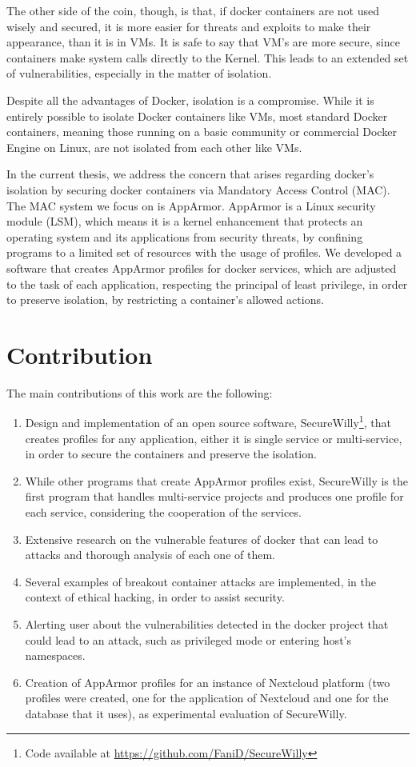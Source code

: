 The other side of the coin, though, is that, if docker containers are not used wisely and secured, it is more easier for threats and exploits to make their appearance, than it is in VMs. It is safe to say that VM's are more secure, since containers make system calls directly to the Kernel. This leads to an extended set of vulnerabilities, especially in the matter of isolation.

Despite all the advantages of Docker, isolation is a compromise. While it is entirely possible to isolate Docker containers like VMs, most standard Docker containers, meaning those running on a basic community or commercial Docker Engine on Linux, are not isolated from each other like VMs.

In the current thesis, we address the concern that arises regarding docker's isolation by securing docker containers via Mandatory Access Control (MAC). The MAC system we focus on is AppArmor. AppArmor is a Linux security module (LSM), which means it is a kernel enhancement that protects an operating system and its applications from security threats, by confining programs to a limited set of resources with the usage of profiles. We developed a software that creates AppArmor profiles for docker services, which are adjusted to the task of each application, respecting the principal of least privilege, in order to preserve isolation, by restricting a container's allowed actions.

\section{Contribution}
The main contributions of this work are the following:
\begin{enumerate}
\item Design and implementation of an open source software, SecureWilly\footnote{Code available at \url{https://github.com/FaniD/SecureWilly}}, that creates profiles for any application, either it is single service or multi-service, in order to secure the containers and preserve the isolation.
\item While other programs that create AppArmor profiles exist, SecureWilly is the first program that handles multi-service projects and produces one profile for each service, considering the cooperation of the services.
\item Extensive research on the vulnerable features of docker that can lead to attacks and thorough analysis of each one of them.
\item Several examples of breakout container attacks are implemented, in the context of ethical hacking, in order to assist security.
\item Alerting user about the vulnerabilities detected in the docker project that could lead to an attack, such as privileged mode or entering host's namespaces.
\item Creation of AppArmor profiles for an instance of Nextcloud platform (two profiles were created, one for the application of Nextcloud and one for the database that it uses), as experimental evaluation of SecureWilly.
\end{enumerate}

